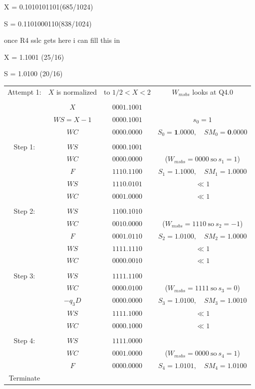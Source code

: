 \documentclass[12pt]{article}
\begin{document}
\vfill
\eject

X = 0.1010101101(685/1024)

S = 0.1101000110(838/1024)

once R4 sslc gets here i can fill this in

\vfill 
\eject

X = 1.1001 (25/16)

S = 1.0100 (20/16)

{\small
\begin{center}
\begin{tabular}{cccc}
    Attempt 1:& $X$ is normalized& to $1/2<X<2$&$W_{msbs}$ looks at Q4.0\\
    &&&\\
            &$X     $&$0001.1001$&\\
            &$WS=X-1$&$0000.1001$& $s_0=1$\\
            &$WC    $&$0000.0000$&$S_0=\mathbf{1}.0000,\quad SM_0=\mathbf{0}.0000$ \\
    \hdashline\\
    Step 1: &$WS    $&$0000.1001$&\\
            &$WC    $&$0000.0000$&($W_{msbs}=0000\ \text{so}\ s_1=1$)\\
            &$F     $&$1110.1100$&$S_1=\mathbf{1.1}000,\quad SM_1=\mathbf{1.0}000$\\
    \cline{2-3}
            &$WS    $&$1110.0101$&$\ll1$\\
            &$WC    $&$0001.0000$&$\ll1$\\
    \hdashline\\
    Step 2: &$WS    $&$1100.1010$&\\
            &$WC    $&$0010.0000$&($W_{msbs}=1110\ \text{so}\ s_2=-1$)\\
            &$F     $&$0001.0110$&$S_2=\mathbf{1.01}00,\quad SM_2=\mathbf{1.00}00$\\
    \cline{2-3}
            &$WS    $&$1111.1110$&$\ll1$\\
            &$WC    $&$0000.0010$&$\ll1$\\
    \hdashline\\
    Step 3: &$WS    $&$1111.1100$&\\
            &$WC    $&$0000.0100$&($W_{msbs}=1111\ \text{so}\ s_3=0$)\\
            &$-q_3D $&$0000.0000$&$S_3=\mathbf{1.010}0,\quad SM_3=\mathbf{1.001}0$\\
    \cline{2-3}
            &$WS    $&$1111.1000$&$\ll1$\\
            &$WC    $&$0000.1000$&$\ll1$\\
    \hdashline\\
    Step 4: &$WS    $&$1111.0000$&\\
            &$WC    $&$0001.0000$&($W_{msbs}=0000\ \text{so}\ s_4=1$)\\
            &$F     $&$0000.0000$&$S_4=\mathbf{1.0101},\quad SM_4=\mathbf{1.0100}$\\
    Terminate&&&
\end{tabular}
\end{center}
}
\end{document}
